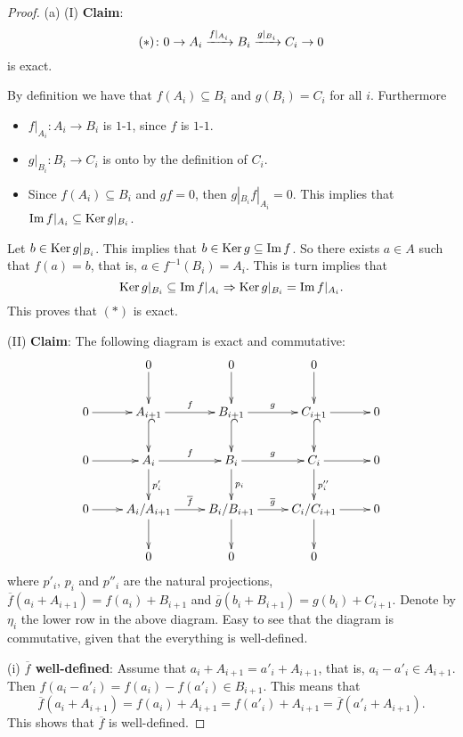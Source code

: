 \begin{proof}
  (a) (I) \textbf{Claim}:
  \[(*)\colon 0\to A_i\xrightarrow{f|_{A_i}} B_i \xrightarrow{g|_{B_i}} C_i\to 0\]
  is exact.

  By definition we have that $f(A_i)\subseteq B_i$ and $g(B_i) = C_i$
  for all $i$.  Furthermore
  \begin{itemize}
    \item $f|_{A_i}\colon A_i\to B_i$ is $1$-$1$, since $f$ is
      $1$-$1$.
    \item $g|_{B_i}\colon B_i\to C_i$ is onto by the definition of
      $C_i$.
    \item Since $f(A_i) \subseteq B_i$ and $gf = 0$, then
      $g|_{B_i}f|_{A_i} = 0$. This implies that $\operatorname{Im}\nolimits f|_{A_i}
      \subseteq \operatorname{Ker}\nolimits g|_{B_i}$.
    \end{itemize}
Let $b\in \operatorname{Ker}\nolimits g|_{B_i}$.  This implies that $b\in\operatorname{Ker}\nolimits g \subseteq \operatorname{Im}\nolimits
f$.  So there exists $a\in A$ such that  $f(a) = b$, that is, $a\in
f^{-1}(B_i) = A_i$.  This is turn implies that
\[\operatorname{Ker}\nolimits g|_{B_i} \subseteq \operatorname{Im}\nolimits f|_{A_i} \Rightarrow \operatorname{Ker}\nolimits g|_{B_i} =
  \operatorname{Im}\nolimits f|_{A_i}.\]
This proves that $(*)$ is exact.

(II) \textbf{Claim}: The following diagram is exact and commutative:
\[\xymatrix{
           & 0\ar[d]              & 0\ar[d]              & 0\ar[d]             & \\
0\ar[r] & A_{i+1} \ar[r]^f\ar@{^(->}[d] & B_{i+1} \ar[r]^g\ar@{^(->}[d] & C_{i+1} \ar[r]\ar@{^(->}[d] &
0\\
0\ar[r] & A_{i} \ar[r]^f\ar[d]^{p'_i} & B_{i} \ar[r]^g\ar[d]^{p_i} & C_{i} \ar[r]\ar[d]^{p''_i} &
0\\
0\ar[r] & A_{i}/A_{i+1} \ar[r]^{\overline{f}}\ar[d] & B_{i}/B_{i+1} \ar[r]^{\overline{g}}\ar[d] & C_{i}/C_{i+1} \ar[r]\ar[d] & 0\\
           & 0              & 0              & 0             & 
}\]
where $p'_i$, $p_i$ and $p''_i$ are the natural projections,
$\overline{f}(a_i + A_{i+1}) = f(a_i) + B_{i+1}$ and $\overline{g}(b_i
+ B_{i+1}) = g(b_i) + C_{i+1}$.  Denote by $\eta_i$ the lower row in
the above diagram.  Easy to see that the diagram is
commutative, given that the everything is well-defined.

(i) \textbf{$\overline{f}$ well-defined}: Assume that $a_i + A_{i+1} =
a'_i + A_{i+1}$, that is, $a_i - a'_i\in A_{i+1}$. Then
$f(a_i-a'_i) = f(a_i) - f(a'_i)\in B_{i+1}$.  This means that
\[\overline{f}(a_i + A_{i+1}) = f(a_i) + A_{i+1} = f(a'_i) + A_{i+1} =
  \overline{f}(a'_i + A_{i+1}).\]
This shows that $\overline{f}$ is well-defined.


\end{proof}
